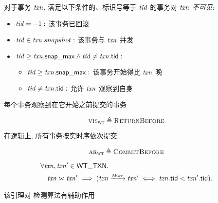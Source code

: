 \begin{frame}{}
  

  \begin{center}
	对于事务 $\mathit{txn}$, 满足以下条件的、标识号等于 $\mathit{tid}$ 的事务对 $\mathit{txn}$ \emph{不可见}:
  \end{center}
  \begin{itemize}
	\setlength{\itemsep}{10pt}
	\item $\mathit{tid} = -1:$ 该事务已回滚
	\item $\mathit{tid} \in \mathit{txn}.snapshot:$ 该事务与 $\mathit{txn}$ 并发
	\item $\mathit{tid} \ge \mathit{txn}.{\sf snap\_max} \land \mathit{tid} \neq \mathit{txn}.{\sf tid}:$
	  \vspace{0.20cm}
	  \begin{itemize}
		\setlength{\itemsep}{5pt}
		\item $\mathit{tid} \ge \mathit{txn}.{\sf snap\_max}:$ 该事务开始得比 $\mathit{txn}$ 晚
		\item $\mathit{tid} \neq \mathit{txn}.{\sf tid}:$ 允许 $\mathit{txn}$ 观察到自身
	  \end{itemize}
  \end{itemize}
\end{frame}

\begin{frame}{}
  \begin{center}
	每个事务观察到在它开始之前提交的事务
  \end{center}

  \begin{definition}
	\[
	  \textsc{vis}_{\textsc{wt}} \triangleq \textsc{ReturnBefore}
	\]
  \end{definition}

  \pause
  \vspace{0.80cm}
  \begin{center}
	在逻辑上, 所有事务按实时序依次提交
  \end{center}
  \begin{definition}
	\[
	  \textsc{ar}_{\textsc{wt}} \triangleq \textsc{CommitBefore}
	\]
  \end{definition}
\end{frame}

\begin{frame}{}
  \begin{lemma}[冲突事务的提交顺序]
	\vspace{-0.30cm}
    \begin{align*}
      &\forall \mathit{txn}, \mathit{txn}' \in {\sf WT\_TXN}.\; \\
        &\quad \mathit{txn} \bowtie \mathit{txn}' \implies (\mathit{txn} \xrightarrow{\textsc{ar}_{\textsc{wt}}} \mathit{txn}'
          \iff \mathit{txn}.{\sf tid} < \mathit{txn}'.{\sf tid}).
    \end{align*}
  \end{lemma}

  \vspace{0.60cm}
  \begin{center}
	该引理对 \strongsi{} 检测算法有辅助作用
  \end{center}
\end{frame}


